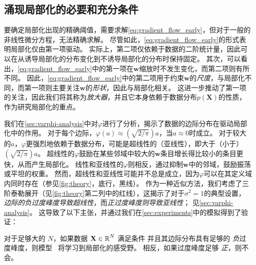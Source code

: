 \subsection{涌现局部化的必要和充分条件}
\label{subsec:localization_conditions}

要确定局部化出现的精确阈值，需要求解\cref{eq:gradient_flow_early}，但对于一般的非线性微分方程，无法精确求解。\smash{\footnotemark}
尽管如此，\cref{eq:gradient_flow_early}的形式表明局部化仅由第一项驱动。
实际上，第二项仅依赖于数据的二阶统计量，因此可以在从诱导局部化的分布变化到不诱导局部化的分布时保持固定。
其次，可以看出，\cref{eq:gradient_flow_early}中的第一项在$\mathbf{w}$缩放时不发生变化，而第二项则有所不同。
因此，\cref{eq:gradient_flow_early}中的第二项用于约束$\mathbf{w}$的\emph{尺度}，与局部化不同，而第一项则主要关注$\mathbf{w}$的\emph{形状}，因此与局部化相关。
这进一步推动了第一项的关注，因此我们将其称为\emph{放大器}，并且它本身依赖于数据分布$p(\mathbf{X})$的性质，
作为研究局部化的重点。



我们在\cref{sec:varphi-analysis}中对$\varphi$进行了分析，揭示了数据的边际分布在驱动局部化中的作用。
对于每个边际，$\varphi(a) \approx (\sqrt{2/\pi}) a$，当$a \approx 0$时成立。
对于较大的$a$，$\varphi$更强烈地依赖于数据分布，可能是超线性的（亚线性），即大于（小于）$(\sqrt{2/\pi}) a$。
超线性的$\varphi$鼓励在某些邻域中较大的$\mathbf{w}$条目增长得比较小的条目更快，从而产生局部化。
线性和亚线性的$\varphi$则相反，通过抑制$\mathbf{w}$中的邻域，鼓励振荡或平坦的权重。
然而，超线性和亚线性可能并不总是成立，因为$\varphi$可以在其定义域内同时存在（参见\cref{fig:theory}，底行，黑线）。
作为一种近似方法，我们考虑了三阶泰勒展开（见\cref{fig:theory}第二列中的红线），这揭示了对于$\sigma^2 = 1$的典型设置，\emph{边际的负过度峰度导致超线性}，而\emph{正过度峰度则导致亚线性}；
见\cref{sec:varphi-analysis}。
这导致了以下主张，并通过我们在\cref{sec:experiments}中的模拟得到了验证：
\begin{claim} \label{thm:localization}
    对于足够大的 $N$，如果数据 $\mathbf{X} \in \operatorname{\mathbb{R}}^N$ 满足条件  并且其边际分布具有足够的 \emph{负}过度峰度，则模型~ 将学习到局部化的感受野。
    相反，如果过度峰度足够 \emph{正}，则不会。
\end{claim}

